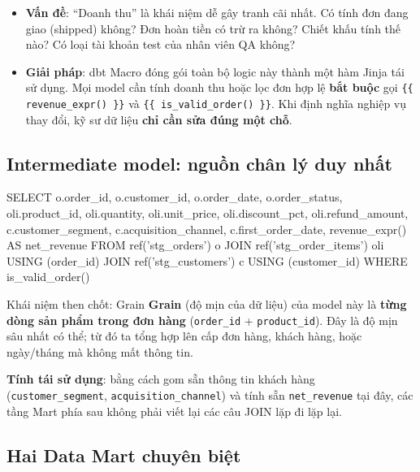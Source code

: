 \documentclass[12pt]{article}
\begin{document}
\begin{itemize}
    \item \textbf{Vấn đề}: ``Doanh thu'' là khái niệm dễ gây tranh cãi nhất. Có tính đơn đang giao (shipped) không? Đơn hoàn tiền có trừ ra không? Chiết khấu tính thế nào? Có loại tài khoản test của nhân viên QA không?
    \item \textbf{Giải pháp}: dbt Macro đóng gói toàn bộ logic này thành một hàm Jinja tái sử dụng. Mọi model cần tính doanh thu hoặc lọc đơn hợp lệ \textbf{bắt buộc} gọi \texttt{\{\{ revenue\_expr() \}\}} và \texttt{\{\{ is\_valid\_order() \}\}}. Khi định nghĩa nghiệp vụ thay đổi, kỹ sư dữ liệu \textbf{chỉ cần sửa đúng một chỗ}.
\end{itemize}

\subsection{Intermediate model: nguồn chân lý duy nhất}

\begin{aivnsqlbox}
SELECT
    o.order_id,
    o.customer_id,
    o.order_date,
    o.order_status,
    oli.product_id,
    oli.quantity,
    oli.unit_price,
    oli.discount_pct,
    oli.refund_amount,
    c.customer_segment,
    c.acquisition_channel,
    c.first_order_date,
    {{ revenue_expr() }}  AS net_revenue
FROM {{ ref('stg_orders') }} o
JOIN {{ ref('stg_order_items') }} oli USING (order_id)
JOIN {{ ref('stg_customers') }} c USING (customer_id)
WHERE {{ is_valid_order() }}
\end{aivnsqlbox}

\begin{infobox}{Khái niệm then chốt: Grain}
\textbf{Grain} (độ mịn của dữ liệu) của model này là \textbf{từng dòng sản phẩm trong đơn hàng} (\texttt{order\_id} + \texttt{product\_id}). Đây là độ mịn sâu nhất có thể; từ đó ta tổng hợp lên cấp đơn hàng, khách hàng, hoặc ngày/tháng mà không mất thông tin.
\end{infobox}

\textbf{Tính tái sử dụng}: bằng cách gom sẵn thông tin khách hàng (\texttt{customer\_segment}, \texttt{acquisition\_channel}) và tính sẵn \texttt{net\_revenue} tại đây, các tầng Mart phía sau không phải viết lại các câu JOIN lặp đi lặp lại.

\subsection{Hai Data Mart chuyên biệt}
\end{document}
